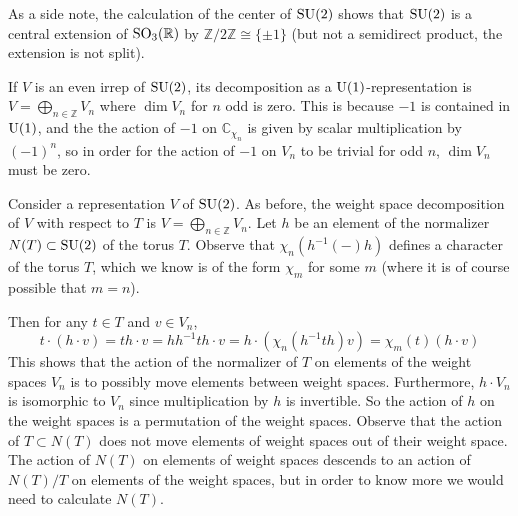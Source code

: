 \documentclass[../../rtnotes.tex]{subfiles}
\begin{document}
As a side note, the calculation of the center of $\operatorname{SU}(2)$ shows that $\operatorname{SU}(2)$ is a central extension of $\operatorname{SO}_3(\mathbb R)$ by $\mathbb Z/2\mathbb Z \cong \{\pm 1\}$ (but not a semidirect product, the extension is not split).

If $V$ is an even irrep of $\operatorname{SU}(2)$, its decomposition as a $\operatorname{U}(1)$-representation is $V = \bigoplus_{n\in\mathbb Z}V_n$ where $\dim V_n$ for $n$ odd is zero. This is because $-1$ is contained in $\operatorname{U}(1)$, and the the action of $-1$ on $\mathbb C_{\chi_n}$ is given by scalar multiplication by $(-1)^n$, so in order for the action of $-1$ on $V_n$ to be trivial for odd $n$, $\dim V_n$ must be zero.

Consider a representation $V$ of $\operatorname{SU}(2)$. As before, the weight space decomposition of $V$ with respect to $T$ is $V = \bigoplus_{n\in\mathbb Z}V_n$. Let $h$ be an element of the normalizer $N(T)\subset \operatorname{SU}(2)$ of the torus $T$. Observe that $\chi_n(h^{-1}(-)h)$ defines a character of the torus $T$, which we know is of the form $\chi_m$ for some $m$ (where it is of course possible that $m = n$).

Then for any $t\in T$ and $v\in V_n$, 
\[t\cdot (h\cdot v) = th\cdot v = hh^{-1}th\cdot v = h\cdot (\chi_n(h^{-1}th)v) = \chi_m(t)(h\cdot v)\]
This shows that the action of the normalizer of $T$ on elements of the weight spaces $V_n$ is to possibly move elements between weight spaces. Furthermore, $h\cdot V_n$ is isomorphic to $V_n$ since multiplication by $h$ is invertible. So the action of $h$ on the weight spaces is a permutation of the weight spaces. Observe that the action of $T\subset N(T)$ does not move elements of weight spaces out of their weight space. The action of $N(T)$ on elements of weight spaces descends to an action of $N(T)/T$ on elements of the weight spaces, but in order to know more we would need to calculate $N(T)$.
\end{document}
